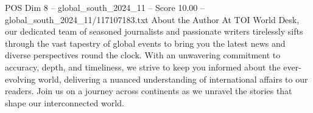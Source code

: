 \begin{textsample}{POS Dim 8 – global\_south\_2024\_11 – Score 10.00 – global\_south\_2024\_11/117107183.txt}
About the Author At TOI World Desk, our dedicated team of seasoned journalists and passionate writers tirelessly sifts through the vast tapestry of global events to bring you the latest news and diverse perspectives round the clock.
With an unwavering commitment to accuracy, depth, and timeliness, we strive to keep you informed about the ever-evolving world, delivering a nuanced understanding of international affairs to our readers.
Join us on a journey across continents as we unravel the stories that shape our interconnected world.

\end{textsample}
